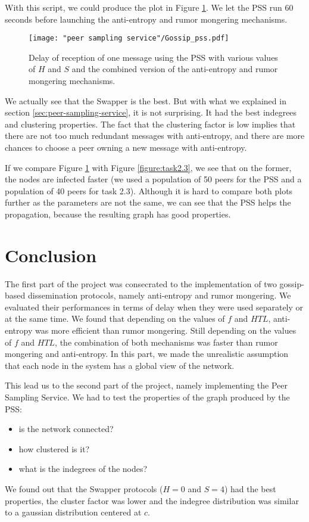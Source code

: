 \documentclass[a4paper, 11pt]{article}
\theoremstyle{plain}
\theoremstyle{definition}
\begin{document}
  With this script, we could produce the plot in Figure \ref{fig:pss_delay}. We let the PSS run 60 seconds
  before launching the anti-entropy and rumor mongering mechanisms.

  \begin{figure}[h]
    \centering
    \texttt{[image: "peer sampling service"/Gossip\_pss.pdf]}
    \caption{Delay of reception of one message using the PSS with various values of $H$ and $S$ and the
      combined version of the anti-entropy and rumor mongering mechanisms.}
    \label{fig:pss_delay}
  \end{figure}

  We actually see that the Swapper is the best. But with what we explained in section
  \ref{sec:peer-sampling-service}, it is not surprising. It had the best indegrees and clustering
  properties. The fact that the clustering factor is low implies that there are not too much redundant
  messages with anti-entropy, and there are more chances to choose a peer owning a new message with
  anti-entropy. 

  If we compare Figure \ref{fig:pss_delay} with Figure \ref{figure:task2.3}, we see that on the former, the
  nodes are infected faster (we used a population of 50 peers for the PSS and a population of 40 peers for
  task 2.3). Although it is hard to compare both plots further as the parameters are not the same, we can see
  that the PSS helps the propagation, because the resulting graph has good properties.

\section{Conclusion}
\label{sec:conclusion}

  
  The first part of the project was consecrated to the implementation of two gossip-based dissemination
  protocols, namely anti-entropy and rumor mongering. We evaluated their performances in terms of delay when
  they were used separately or at the same time. We found that depending on the values of $f$ and $HTL$, 
  anti-entropy was more efficient than rumor mongering. Still depending on the values of $f$ and $HTL$, the
  combination of both mechanisms was faster than rumor mongering and anti-entropy. In this part, we made the
  unrealistic assumption that each node in the system has a global view of the network.

  This lead us to the second part of the project, namely implementing the Peer Sampling Service. We had to
  test the properties of the graph produced by the PSS:
  \begin{itemize}
  \item is the network connected?
  \item how clustered is it?
  \item what is the indegrees of the nodes?
  \end{itemize}
  We found out that the Swapper protocols ($H=0$ and $S=4$) had the best properties, the cluster factor was
  lower and the indegree distribution was similar to a gaussian distribution centered at $c$.
\end{document}

